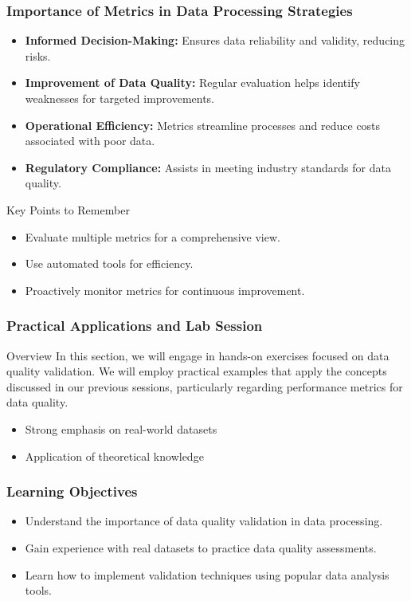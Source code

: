 \documentclass[aspectratio=169]{beamer}
\begin{document}
\begin{frame}[fragile]
    \frametitle{Importance of Metrics in Data Processing Strategies}
    \begin{itemize}
        \item \textbf{Informed Decision-Making:} Ensures data reliability and validity, reducing risks.
        \item \textbf{Improvement of Data Quality:} Regular evaluation helps identify weaknesses for targeted improvements.
        \item \textbf{Operational Efficiency:} Metrics streamline processes and reduce costs associated with poor data.
        \item \textbf{Regulatory Compliance:} Assists in meeting industry standards for data quality.
    \end{itemize}

    \begin{block}{Key Points to Remember}
        \begin{itemize}
            \item Evaluate multiple metrics for a comprehensive view.
            \item Use automated tools for efficiency.
            \item Proactively monitor metrics for continuous improvement.
        \end{itemize}
    \end{block}
\end{frame}

\begin{frame}
    \frametitle{Practical Applications and Lab Session}
    \begin{block}{Overview}
        In this section, we will engage in hands-on exercises focused on data quality validation. We will employ practical examples that apply the concepts discussed in our previous sessions, particularly regarding performance metrics for data quality.
    \end{block}
    \begin{itemize}
        \item Strong emphasis on real-world datasets
        \item Application of theoretical knowledge
    \end{itemize}
\end{frame}

\begin{frame}
    \frametitle{Learning Objectives}
    \begin{itemize}
        \item Understand the importance of data quality validation in data processing.
        \item Gain experience with real datasets to practice data quality assessments.
        \item Learn how to implement validation techniques using popular data analysis tools.
    \end{itemize}
\end{frame}
\end{document}
